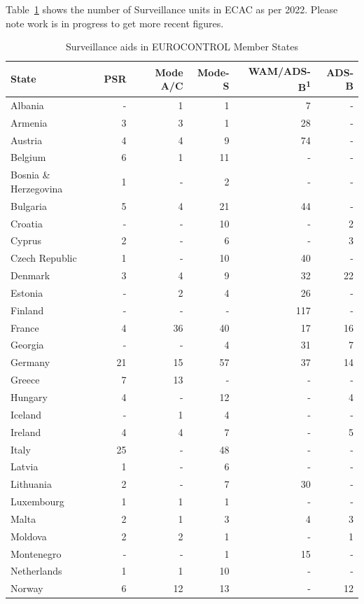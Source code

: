 \documentclass[
  11pt,
  a4paper,
]{book}
\begin{document}
Table~\ref{tbl-cns-ecac-surv} shows the number of Surveillance units in
ECAC as per 2022. Please note work is in progress to get more recent
figures.

\hypertarget{tbl-cns-ecac-surv}{}
\setlength{\LTpost}{0mm}
\begin{longtable}{lrrrrr}
\caption{\label{tbl-cns-ecac-surv}Surveillance aids in EUROCONTROL Member States }\tabularnewline

\toprule
State & PSR & Mode A/C & Mode-S & WAM/ADS-B\textsuperscript{1} & ADS-B \\ 
\midrule
Albania & - & 1 & 1 & 7 & - \\ 
Armenia & 3 & 3 & 1 & 28 & - \\ 
Austria & 4 & 4 & 9 & 74 & - \\ 
Belgium & 6 & 1 & 11 & - & - \\ 
Bosnia \& Herzegovina & 1 & - & 2 & - & - \\ 
Bulgaria & 5 & 4 & 21 & 44 & - \\ 
Croatia & - & - & 10 & - & 2 \\ 
Cyprus & 2 & - & 6 & - & 3 \\ 
Czech Republic & 1 & - & 10 & 40 & - \\ 
Denmark & 3 & 4 & 9 & 32 & 22 \\ 
Estonia & - & 2 & 4 & 26 & - \\ 
Finland & - & - & - & 117 & - \\ 
France & 4 & 36 & 40 & 17 & 16 \\ 
Georgia & - & - & 4 & 31 & 7 \\ 
Germany & 21 & 15 & 57 & 37 & 14 \\ 
Greece & 7 & 13 & - & - & - \\ 
Hungary & 4 & - & 12 & - & 4 \\ 
Iceland & - & 1 & 4 & - & - \\ 
Ireland & 4 & 4 & 7 & - & 5 \\ 
Italy & 25 & - & 48 & - & - \\ 
Latvia & 1 & - & 6 & - & - \\ 
Lithuania & 2 & - & 7 & 30 & - \\ 
Luxembourg & 1 & 1 & 1 & - & - \\ 
Malta & 2 & 1 & 3 & 4 & 3 \\ 
Moldova & 2 & 2 & 1 & - & 1 \\ 
Montenegro & - & - & 1 & 15 & - \\ 
Netherlands & 1 & 1 & 10 & - & - \\ 
Norway & 6 & 12 & 13 & - & 12 \\ 

\end{longtable}
\end{document}

